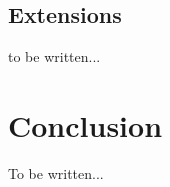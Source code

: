 \documentclass[12pt,oneside]{article}
\begin{document}


\subsection{Extensions}
to be written...

\section{Conclusion}
\label{sec:conclusion}

To be written...

\printbibliography%
\end{document}
